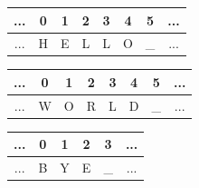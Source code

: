 \documentclass{beamer}
\begin{document}
\begin{frame}[fragile]
\begin{columns}[t]
\begin{column}{0.4\textwidth}
\begin{flushleft}
\begin{tabular}{c | c | c | c | c | c | c | c }
\hline
...&0 &1 &2 &3 &4 &5   &... \\\hline
...&H &E &L &L &O & \_ &... \\\hline
\end{tabular}

\begin{tabular}{c | c | c | c | c | c | c | c }
\hline
...&0 &1 &2 &3 &4 &5   &... \\\hline
...&W  &O &R &L &D & \_ &... \\\hline
\end{tabular}

\begin{tabular}{c | c | c | c | c | c  }
\hline
...&0 &1 &2 &3   &... \\\hline
...&B &Y &E & \_ &... \\\hline
\end{tabular}

\end{flushleft}

  \end{column}
\end{columns}


\end{frame}
\end{document}
